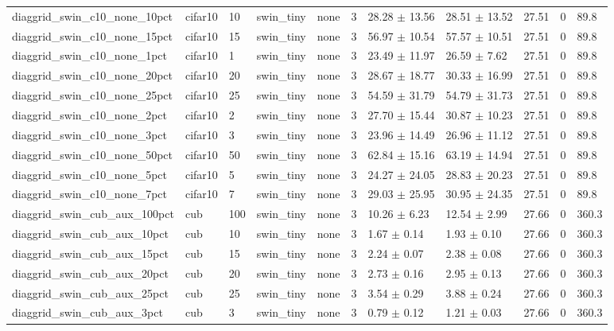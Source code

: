 \begin{tabular}{lllllllllll}
diaggrid_swin_c10_none_10pct & cifar10 & 10 & swin_tiny & none & 3 & 28.28 $\pm$ 13.56 & 28.51 $\pm$ 13.52 & 27.51 & 0 & 89.8 \\
diaggrid_swin_c10_none_15pct & cifar10 & 15 & swin_tiny & none & 3 & 56.97 $\pm$ 10.54 & 57.57 $\pm$ 10.51 & 27.51 & 0 & 89.8 \\
diaggrid_swin_c10_none_1pct & cifar10 & 1 & swin_tiny & none & 3 & 23.49 $\pm$ 11.97 & 26.59 $\pm$ 7.62 & 27.51 & 0 & 89.8 \\
diaggrid_swin_c10_none_20pct & cifar10 & 20 & swin_tiny & none & 3 & 28.67 $\pm$ 18.77 & 30.33 $\pm$ 16.99 & 27.51 & 0 & 89.8 \\
diaggrid_swin_c10_none_25pct & cifar10 & 25 & swin_tiny & none & 3 & 54.59 $\pm$ 31.79 & 54.79 $\pm$ 31.73 & 27.51 & 0 & 89.8 \\
diaggrid_swin_c10_none_2pct & cifar10 & 2 & swin_tiny & none & 3 & 27.70 $\pm$ 15.44 & 30.87 $\pm$ 10.23 & 27.51 & 0 & 89.8 \\
diaggrid_swin_c10_none_3pct & cifar10 & 3 & swin_tiny & none & 3 & 23.96 $\pm$ 14.49 & 26.96 $\pm$ 11.12 & 27.51 & 0 & 89.8 \\
diaggrid_swin_c10_none_50pct & cifar10 & 50 & swin_tiny & none & 3 & 62.84 $\pm$ 15.16 & 63.19 $\pm$ 14.94 & 27.51 & 0 & 89.8 \\
diaggrid_swin_c10_none_5pct & cifar10 & 5 & swin_tiny & none & 3 & 24.27 $\pm$ 24.05 & 28.83 $\pm$ 20.23 & 27.51 & 0 & 89.8 \\
diaggrid_swin_c10_none_7pct & cifar10 & 7 & swin_tiny & none & 3 & 29.03 $\pm$ 25.95 & 30.95 $\pm$ 24.35 & 27.51 & 0 & 89.8 \\
diaggrid_swin_cub_aux_100pct & cub & 100 & swin_tiny & none & 3 & 10.26 $\pm$ 6.23 & 12.54 $\pm$ 2.99 & 27.66 & 0 & 360.3 \\
diaggrid_swin_cub_aux_10pct & cub & 10 & swin_tiny & none & 3 & 1.67 $\pm$ 0.14 & 1.93 $\pm$ 0.10 & 27.66 & 0 & 360.3 \\
diaggrid_swin_cub_aux_15pct & cub & 15 & swin_tiny & none & 3 & 2.24 $\pm$ 0.07 & 2.38 $\pm$ 0.08 & 27.66 & 0 & 360.3 \\
diaggrid_swin_cub_aux_20pct & cub & 20 & swin_tiny & none & 3 & 2.73 $\pm$ 0.16 & 2.95 $\pm$ 0.13 & 27.66 & 0 & 360.3 \\
diaggrid_swin_cub_aux_25pct & cub & 25 & swin_tiny & none & 3 & 3.54 $\pm$ 0.29 & 3.88 $\pm$ 0.24 & 27.66 & 0 & 360.3 \\
diaggrid_swin_cub_aux_3pct & cub & 3 & swin_tiny & none & 3 & 0.79 $\pm$ 0.12 & 1.21 $\pm$ 0.03 & 27.66 & 0 & 360.3 \\

\end{tabular}
